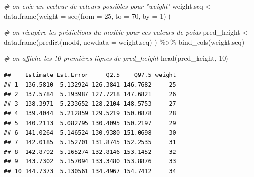 \documentclass[
  a4paper,11pt,twoside,onecolumn,openright,final,oldfontcommands]{memoir}
\newenvironment{Shaded}{\begin{snugshade}}{\end{snugshade}}
\newcommand{\AttributeTok}[1]{\textcolor[rgb]{0.77,0.63,0.00}{#1}}
\newcommand{\CommentTok}[1]{\textcolor[rgb]{0.56,0.35,0.01}{\textit{#1}}}
\newcommand{\DecValTok}[1]{\textcolor[rgb]{0.00,0.00,0.81}{#1}}
\newcommand{\FunctionTok}[1]{\textcolor[rgb]{0.00,0.00,0.00}{#1}}
\newcommand{\NormalTok}[1]{#1}
\newcommand{\OtherTok}[1]{\textcolor[rgb]{0.56,0.35,0.01}{#1}}
\newcommand{\SpecialCharTok}[1]{\textcolor[rgb]{0.00,0.00,0.00}{#1}}
\theoremstyle{definition}
\theoremstyle{definition}
\theoremstyle{definition}
\theoremstyle{definition}
\theoremstyle{remark}
\begin{document}
\begin{Shaded}
\begin{Highlighting}[]
\CommentTok{\# on crée un vecteur de valeurs possibles pour "weight"}
\NormalTok{weight.seq }\OtherTok{\textless{}{-}} \FunctionTok{data.frame}\NormalTok{(}\AttributeTok{weight =} \FunctionTok{seq}\NormalTok{(}\AttributeTok{from =} \DecValTok{25}\NormalTok{, }\AttributeTok{to =} \DecValTok{70}\NormalTok{, }\AttributeTok{by =} \DecValTok{1}\NormalTok{) )}

\CommentTok{\# on récupère les prédictions du modèle pour ces valeurs de poids}
\NormalTok{pred\_height }\OtherTok{\textless{}{-}} \FunctionTok{data.frame}\NormalTok{(}\FunctionTok{predict}\NormalTok{(mod4, }\AttributeTok{newdata =}\NormalTok{ weight.seq) ) }\SpecialCharTok{\%\textgreater{}\%} \FunctionTok{bind\_cols}\NormalTok{(weight.seq)}

\CommentTok{\# on affiche les 10 premières lignes de pred\_height}
\FunctionTok{head}\NormalTok{(pred\_height, }\DecValTok{10}\NormalTok{)}
\end{Highlighting}
\end{Shaded}

\begin{verbatim}
##    Estimate Est.Error     Q2.5    Q97.5 weight
## 1  136.5810  5.132924 126.3841 146.7682     25
## 2  137.5784  5.193987 127.7218 147.6821     26
## 3  138.3971  5.233652 128.2104 148.5753     27
## 4  139.4044  5.212859 129.5219 150.0878     28
## 5  140.2113  5.082795 130.4095 150.2197     29
## 6  141.0264  5.146524 130.9380 151.0698     30
## 7  142.0185  5.152701 131.8745 152.2535     31
## 8  142.8792  5.165274 132.8146 153.1452     32
## 9  143.7302  5.157094 133.3480 153.8876     33
## 10 144.7373  5.130561 134.4967 154.7412     34
\end{verbatim}
\end{document}
